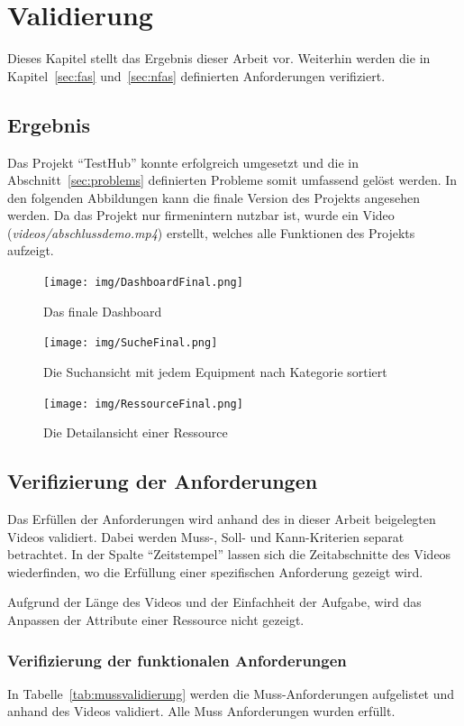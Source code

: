\section{Validierung}
Dieses Kapitel stellt das Ergebnis dieser Arbeit vor. Weiterhin werden die in 
Kapitel~\ref{sec:fas} und~\ref{sec:nfas} definierten Anforderungen verifiziert.

\subsection{Ergebnis}
Das Projekt ``TestHub'' konnte erfolgreich umgesetzt und die in Abschnitt~\ref{sec:problems}
definierten Probleme somit umfassend gelöst werden. 
In den folgenden Abbildungen kann die finale Version des Projekts angesehen werden.
Da das Projekt nur firmenintern nutzbar ist, wurde ein Video 
(\textit{videos/abschlussdemo.mp4}) erstellt, welches alle Funktionen des 
Projekts aufzeigt. 

\begin{figure}[H]
    \texttt{[image: img/DashboardFinal.png]}
    \caption{Das finale Dashboard}
\end{figure}

\begin{figure}[H]
    \texttt{[image: img/SucheFinal.png]}
    \caption{Die Suchansicht mit jedem Equipment nach Kategorie sortiert}
\end{figure}

\begin{figure}[H]
    \texttt{[image: img/RessourceFinal.png]}
    \caption{Die Detailansicht einer Ressource}
\end{figure}

\subsection{Verifizierung der Anforderungen}
Das Erfüllen der Anforderungen wird anhand des in dieser Arbeit beigelegten Videos 
validiert. Dabei werden Muss-, Soll- und Kann-Kriterien separat betrachtet.
In der Spalte ``Zeitstempel'' lassen sich die Zeitabschnitte des Videos wiederfinden,
wo die Erfüllung einer spezifischen Anforderung gezeigt wird.

Aufgrund der Länge des Videos und der Einfachheit der Aufgabe, wird das Anpassen
der Attribute einer Ressource nicht gezeigt.

\subsubsection{Verifizierung der funktionalen Anforderungen}
In Tabelle~\ref{tab:mussvalidierung} werden die Muss-Anforderungen aufgelistet
und anhand des Videos validiert. Alle Muss Anforderungen wurden erfüllt.

